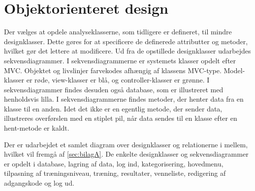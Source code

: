 \section{Objektorienteret design}
Der vælges at opdele analyseklasserne, som tidligere er defineret, til mindre designklasser. Dette gøres for at specificere de definerede attributter og metoder, hvilket gør det lettere at modificere. Ud fra de opstillede designklasser udarbejdes sekvensdiagrammer. I sekvensdiagrammerne er systemets klasser opdelt efter MVC. Objektet og livslinjer farvekodes afhængig af klassens MVC-type. Model-klasser er røde, view-klasser er blå, og controller-klasser er grønne. I sekvensdiagrammer findes desuden også database, som er illustreret med henholdsvis lilla. I sekvensdiagrammerne findes metoder, der henter data fra en klasse til en anden. Idet det ikke er en egentlig metode, der sender data, illustreres overførslen med en stiplet pil, når data sendes til en klasse efter en hent-metode er kaldt. 

Der er udarbejdet et samlet diagram over designklasser og relationerne i mellem, hvilket vil fremgå af \autoref{sec:bilagA}. De enkelte designklasser og sekvensdiagrammer er opdelt i database, lagring af data, log ind, kategorisering, hovedmenu, tilpasning af træningsniveau, træning, resultater, venneliste, redigering af adgangskode og log ud. 

